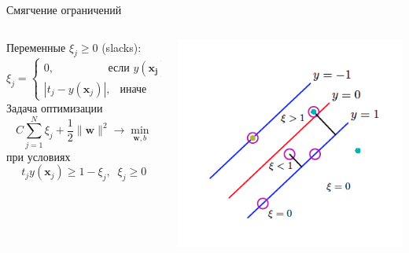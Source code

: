 \documentclass[aspectratio=169]{beamer}
\begin{document}
\begin{frame}{Смягчение ограничений}

\begin{columns}[T]
    \begin{column}{.51\textwidth}
    
    Переменные $\xi_j \geq 0$ (slacks):
    \[
    \xi_j = \begin{cases}
    0, \quad\quad\quad\quad\;\;\text{ если }y(\mathbf{x_j}) t_j \geq 1  \\
    |t_j - y(\mathbf{x}_j)|, \;\,\text{ иначе}
    \end{cases}
    \]
    Задача оптимизации
    \[
    C \sum_{j=1}^N \xi_j + \frac{1}{2}\|\mathbf{w}\|^2 \rightarrow \min_{\mathbf{w}, b}
    \]
    при условиях
    \[
		t_j y(\mathbf{x}_j) \geq 1 - \xi_j, \;\; \xi_j \geq 0
		\]

	
    \end{column}
       
    \begin{column}{.5\textwidth}
    	\vspace{-1em}
		\begin{center}
   			\includegraphics[scale=0.45]{images/slack.png}
    	\end{center}
	\end{column}
\end{columns}
  
\end{frame}
\end{document}

